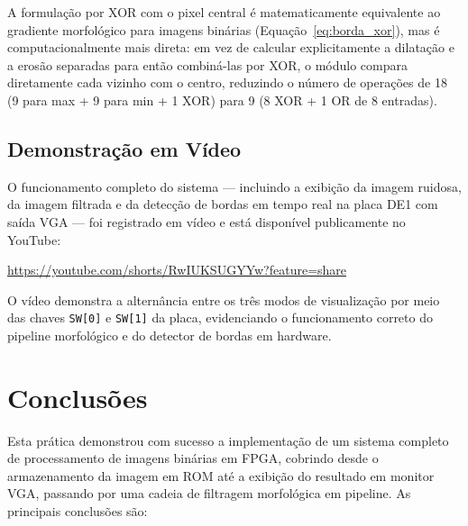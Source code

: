 \documentclass[12pt, a4paper]{article}
\begin{document}
	A formulação por XOR com o pixel central é matematicamente equivalente ao
	gradiente morfológico para imagens binárias (Equação~\ref{eq:borda_xor}),
	mas é computacionalmente mais direta: em vez de calcular explicitamente a
	dilatação e a erosão separadas para então combiná-las por XOR, o módulo
	compara diretamente cada vizinho com o centro, reduzindo o número de operações
	de 18 (9 para max + 9 para min + 1 XOR) para 9 (8 XOR + 1 OR de 8 entradas).
	
	\subsection{Demonstração em Vídeo}
	
	O funcionamento completo do sistema --- incluindo a exibição da imagem ruidosa,
	da imagem filtrada e da detecção de bordas em tempo real na placa DE1 com saída
	VGA --- foi registrado em vídeo e está disponível publicamente no YouTube:
	
	\begin{center}
		\url{https://youtube.com/shorts/RwIUKSUGYYw?feature=share}
	\end{center}
	
	\noindent O vídeo demonstra a alternância entre os três modos de visualização
	por meio das chaves \texttt{SW[0]} e \texttt{SW[1]} da placa, evidenciando o
	funcionamento correto do pipeline morfológico e do detector de bordas em hardware.
	
	\section{Conclusões}
	
	Esta prática demonstrou com sucesso a implementação de um sistema completo de
	processamento de imagens binárias em FPGA, cobrindo desde o armazenamento da
	imagem em ROM até a exibição do resultado em monitor VGA, passando por uma cadeia
	de filtragem morfológica em pipeline. As principais conclusões são:
	
\end{document}

